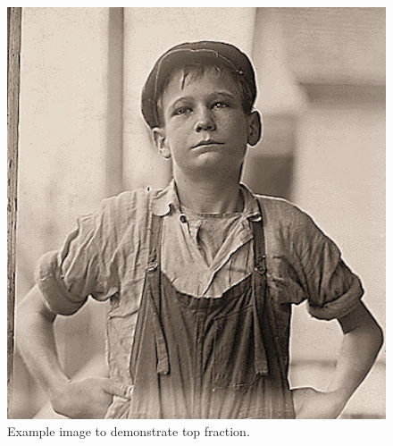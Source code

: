 \documentclass[twoside,twocolumn]{book}
\begin{document}
\begin{figure}[tpb]
\centering
\includegraphics[width=\columnwidth]{./chapters/hine04-xx}
\caption{Example image to demonstrate top fraction.}\par
\the\pagegoal\the\pagetotal
{} 
\end{figure}
\lipsum

\end{document}
